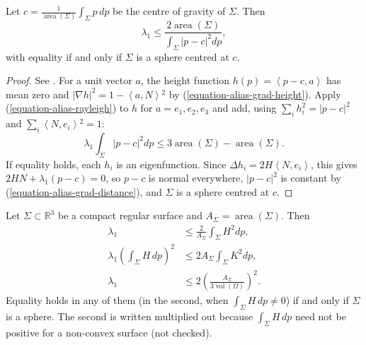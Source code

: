 \begin{lemma}
\label{lemma-alias-lambda1-centroid}
Let $c=\frac{1}{\operatorname{area}
(\Sigma)}\int_\Sigma p\,dp$ be the centre of
gravity of $\Sigma$. Then
$$
\lambda_1\leq
\frac{2\operatorname{area}(\Sigma)}
{\int_\Sigma|p-c|^2dp},
$$
with equality if and only if $\Sigma$ is a
sphere centred at $c$.
\end{lemma}

\begin{proof}
See \cite[Lemma 5.4,
pp.~49--51]{alias2006analisis}. For a
unit vector $a$, the height function
$h(p)=\left\langle{} p-c,a
\right\rangle{}$ has mean zero and
$|\nabla h|^2=1-\left\langle{} a,N
\right\rangle{}^2$ by
(\ref{equation-alias-grad-height}). Apply
(\ref{equation-alias-rayleigh}) to $h$ for
$a=e_1,e_2,e_3$ and add, using
$\sum_ih_i^2=|p-c|^2$ and
$\sum_i\left\langle{} N,e_i
\right\rangle{}^2=1$:
$$
\lambda_1\int_\Sigma|p-c|^2dp
\leq 3\operatorname{area}(\Sigma)
-\operatorname{area}(\Sigma).
$$
If equality holds, each $h_i$ is an
eigenfunction. Since
$\Delta h_i=2H\left\langle{} N,e_i
\right\rangle{}$, this gives
$2HN+\lambda_1(p-c)=0$, so $p-c$ is
normal everywhere, $|p-c|^2$ is constant
by (\ref{equation-alias-grad-distance}),
and $\Sigma$ is a sphere centred at $c$.
\end{proof}

\begin{theorem}[Reilly]
\label{theorem-alias-reilly-eigenvalue}
Let $\Sigma\subset\mathbb{R}^3$ be a
compact regular surface and
$A_\Sigma=\operatorname{area}(\Sigma)$.
Then
$$
\begin{aligned}
\lambda_1&\leq\frac{2}{A_\Sigma}
\int_\Sigma H^2dp,\\
\lambda_1\left(\int_\Sigma H\,dp
\right)^2&\leq 2A_\Sigma
\int_\Sigma K^2dp,\\
\lambda_1&\leq 2\left(
\frac{A_\Sigma}
{3\operatorname{vol}(\Omega)}\right)^2.
\end{aligned}
$$
Equality holds in any of them (in the
second, when $\int_\Sigma H\,dp\neq 0$) if
and only if $\Sigma$ is a sphere. The
second is written multiplied out because
$\int_\Sigma H\,dp$ need not be positive
for a non-convex surface (not checked).
\end{theorem}

